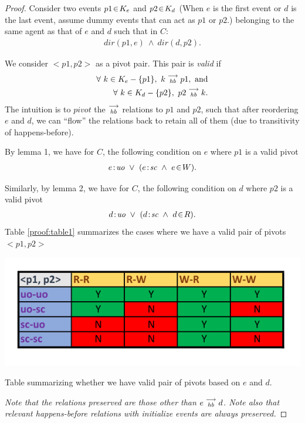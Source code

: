 \begin{proof}
        Consider two events $p1\!\in\!K_e$ and $p2\!\in\!K_d$ (When $e$ is the first event or $d$ is the last event, assume dummy events that can act as $p1$ or $p2$.) belonging to the same agent as that of $e$ and $d$ such that in $C$:
        \begin{align*}
            dir(p1,e)\ \wedge\ dir(d,p2).
        \end{align*}
        
        We consider $<p1,p2>$ as a pivot pair. This pair is  \textit{valid} if 
        \begin{align*}
            \forall \ k \in K_e - \{p1\}, \ \reln{k}{hb}{p1},\ \textrm{and} \\
            \forall \ k \in K_d - \{p2\}, \ \reln{p2}{hb}{k}.
        \end{align*}
        The intuition is to $pivot$ the $\stackrel{\longrightarrow}{_{hb}}$ relations to $p1$ and $p2$, such that after reordering $e$ and $d$, we can ``flow'' the relations back to retain all of them (due to transitivity of happens-before).
        
        By lemma 1, we have for $C$, the following condition on $e$ where $p1$ is a valid pivot
        \begin{align*}
            e\!:\!\textit{uo}\ \vee\ (e\!:\!\textit{sc}\ \wedge\ e\!\in\!W).
        \end{align*}
        
        Similarly, by lemma 2, we have for $C$, the following condition on $d$ where $p2$ is a valid pivot
        \begin{align*}
            d\!:\!\textit{uo}\ \vee\ (d\!:\!\textit{sc}\ \wedge\ d\!\in\!R).
        \end{align*}
        Table \ref{proof:table1} summarizes the cases where we have a valid pair of pivots $<p1,p2>$
        \begin{table}[H]
            \centering
            \includegraphics[scale=0.7]{Table1_Final.pdf}
            \caption{Table summarizing whether we have valid pair of pivots based on  $e$ and $d$.}
            \label{proof:table1}
        \end{table}
        \emph{Note that the relations preserved are those other than $e\stackrel{\longrightarrow}{_{\textit{hb}}}d$. Note also that relevant happens-before relations with initialize events are always preserved. }
        

\end{proof}
